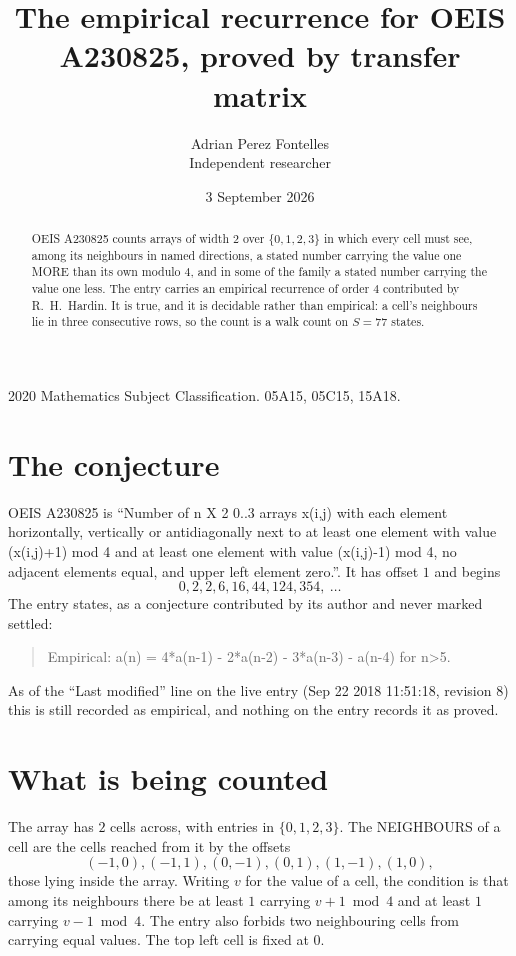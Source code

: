 \documentclass[11pt,a4paper]{article}
\title{The empirical recurrence for OEIS A230825, proved by transfer matrix}
\author{Adrian Perez Fontelles\\ \small Independent researcher}
\date{3 September 2026}
\theoremstyle{plain}
\theoremstyle{definition}
\begin{document}
\maketitle

\begin{abstract}
OEIS A230825 counts arrays of width $2$ over $\{0,1,2,3\}$ in which every cell must see, among its
neighbours in named directions, a stated number carrying the value one MORE than its own
modulo $4$, and in some of the family a stated number carrying the value one less. The entry
carries an empirical recurrence of order $4$ contributed by R.~H.~Hardin. It is true, and
it is decidable rather than empirical: a cell's neighbours lie in three consecutive rows, so
the count is a walk count on $S=77$ states.
\end{abstract}

\noindent\small 2020 Mathematics Subject Classification. 05A15, 05C15, 15A18.\normalsize

\section{The conjecture}

OEIS A230825 is ``Number of n X 2 0..3 arrays x(i,j) with each element horizontally, vertically or antidiagonally next to at least one element with value (x(i,j)+1) mod 4 and at least one element with value (x(i,j)-1) mod 4, no adjacent elements equal, and upper left element zero.''. It has offset $1$ and begins
\[
0, 2, 2, 6, 16, 44, 124, 354,\ \dots
\]
The entry states, as a conjecture contributed by its author and never marked settled:
\begin{quote}
Empirical: a(n) = 4*a(n-1) - 2*a(n-2) - 3*a(n-3) - a(n-4) for n>5.
\end{quote}
As of the ``Last modified'' line on the live entry (Sep 22 2018 11:51:18, revision 8) this is still
recorded as empirical, and nothing on the entry records it as proved.

\section{What is being counted}

The array has $2$ cells across, with entries in $\{0,1,2,3\}$. The NEIGHBOURS of a cell are the
cells reached from it by the offsets
\[
(-1,0), (-1,1), (0,-1), (0,1), (1,-1), (1,0),
\]
those lying inside the array. Writing $v$ for the value of a cell, the condition is that among
its neighbours there be at least $1$ carrying $v+1 \bmod 4$ and at least $1$ carrying $v-1 \bmod 4$. The entry also forbids two neighbouring cells from carrying equal values. The top left
cell is fixed at $0$.
\end{document}
